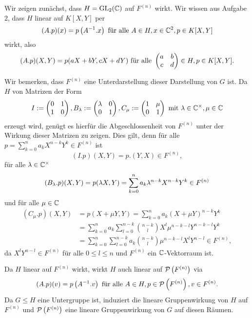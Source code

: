 \documentclass[a4paper,10pt]{article}
\begin{document}
\section{}


\subsection{}
Wir zeigen zunächst, dass $H = \operatorname{GL}_2(\mathbb{C})$ auf $F^{(n)}$ wirkt. Wir wissen aus Aufgabe 2, dass $H$ linear auf $K[X,Y]$ per
\[
 (A.p)(x) = p\left(A^{-1}.x\right) \text{ für alle } A \in H, x \in \mathbb{C}^2, p \in K[X,Y]
\]
wirkt, also
\[
 (A.p)(X,Y) = p(aX+bY, cX+dY) \text{ für alle } \begin{pmatrix}a&b\\c&d\end{pmatrix} \in H, p \in K[X,Y].
\]

Wir bemerken, dass $F^{(n)}$ eine Unterdarstellung dieser Darstellung von $G$ ist. Da $H$ von Matrizen der Form
\[
 I := \begin{pmatrix}0&1\\1&0\end{pmatrix}, B_\lambda := \begin{pmatrix}\lambda&0\\0&1\end{pmatrix}, C_\mu := \begin{pmatrix}1&\mu\\0&1\end{pmatrix} \text{ mit } \lambda \in \mathbb{C}^\times, \mu \in \mathbb{C}
\]
erzeugt wird, genügt es hierfür die Abgeschlossenheit von $F^{(n)}$ unter der Wirkung dieser Matrizen zu zeigen. Dies gilt, denn für alle $p = \sum_{k=0}^n a_k X^{n-k} Y^k \in F^{(n)}$ ist
\[
 (I.p)(X,Y) = p.(Y,X) \in F^{(n)},
\]
für alle $\lambda \in \mathbb{C}^\times$
\[
 (B_\lambda.p)(X,Y) = p(\lambda X, Y) = \sum_{k=0}^n a_k \lambda^{n-k} X^{n-k} Y^k \in F^{(n)} \\
\]
und für alle $\mu \in \mathbb{C}$
\begin{align*}
 (C_\mu.p)(X,Y)
 &= p(X + \mu Y, Y)
 = \sum_{k=0}^n a_k (X + \mu Y)^{n-k} Y^k \\
 &= \sum_{k=0}^n a_k \sum_{l=0}^{n-k} \binom{n-k}{l} X^l \mu^{n-k-l} Y^{n-k-l} Y^k \\
 &= \sum_{k=0}^n \sum_{l=0}^{n-k} a_k \binom{n-k}{l} \mu^{n-k-l} X^l  Y^{n-l} \in F^{(n)},
\end{align*}
da $X^l Y^{n-l} \in F^{(n)}$ für alle $0 \leq l \leq n$ und $F^{(n)}$ ein $\mathbb{C}$-Vektorraum ist.

Da $H$ linear auf $F^{(n)}$ wirkt, wirkt $H$ auch linear auf $\mathcal{P}\left(F^{(n)}\right)$ via
\[
 (A.p)(v) = p\left(A^{-1}.v\right) \text{ für alle } A \in H, p \in \mathcal{P}\left(F^{(n)}\right), v \in F^{(n)}.
\]
Da $G \leq H$ eine Untergruppe ist, induziert die lineare Gruppenwirkung von $H$ auf $F^{(n)}$ und $\mathcal{P}\left(F^{(n)}\right)$ eine lineare Gruppenwirkung von $G$ auf diesen Räumen.
\end{document}
